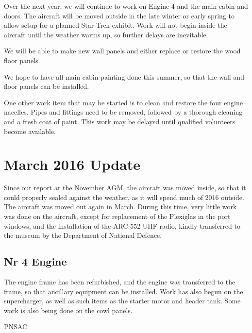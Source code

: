 Over the next year, we will continue to work on Engine 4 and the main
cabin and doors.  The aircraft will be moved outside in the late
winter or early spring to allow setup for a planned Star Trek exhibit.
Work will not begin inside the aircraft until the weather warms up, so
further delays are inevitable.  

We will be able to make new wall panels and either replace or restore
the wood floor panels.

We hope to have all main cabin painting done this summer, so that the
wall and floor panels can be installed.  

One other work item that may be started is to clean and restore the
four engine nacelles.  Pipes and fittings need to be removed, followed
by a thorough cleaning and a fresh coat of paint.  This work may be
delayed until qualified volunteers become available.

\section{March 2016 Update}
\label{sec:update}

Since our report at the November AGM, the aircraft was moved inside,
so that it could properly sealed against the weather, as it will spend
much of 2016 outside. The aircraft was moved out again in March.
During this time, very little work was done on the aircraft, except
for replacement of the Plexiglas in the port windows, and the
installation of the ARC-552 UHF radio, kindly transferred to the
museum by the Department of National Defence.

\subsection{Nr 4 Engine}
\label{sec:update-engine}

The engine frame has been refurbished, and the engine was transferred
to the frame, so that ancillary equipment can be installed.  Work has
also begun on the supercharger, as well as such items as the starter
motor and header tank.  Some work is also being done on the cowl panels.



\begin{footnotesize}
  \raggedleft PNSAC\\
\end{footnotesize}



